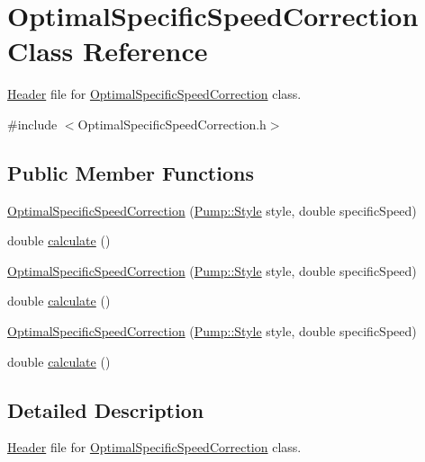 \hypertarget{class_optimal_specific_speed_correction}{}\section{Optimal\+Specific\+Speed\+Correction Class Reference}
\label{class_optimal_specific_speed_correction}


\hyperlink{class_header}{Header} file for \hyperlink{class_optimal_specific_speed_correction}{Optimal\+Specific\+Speed\+Correction} class.  




{\ttfamily \#include $<$Optimal\+Specific\+Speed\+Correction.\+h$>$}

\subsection*{Public Member Functions}
\begin{DoxyCompactItemize}
\item 
\hyperlink{class_optimal_specific_speed_correction_a59cfd32e730fabce525602cbe0b646c4}{Optimal\+Specific\+Speed\+Correction} (\hyperlink{class_pump_aef354601ce4218258cc898b35a1e90ff}{Pump\+::\+Style} style, double specific\+Speed)
\item 
double \hyperlink{class_optimal_specific_speed_correction_a3337ebde4e64c20f19adbda6204fa0be}{calculate} ()
\item 
\hyperlink{class_optimal_specific_speed_correction_a59cfd32e730fabce525602cbe0b646c4}{Optimal\+Specific\+Speed\+Correction} (\hyperlink{class_pump_aef354601ce4218258cc898b35a1e90ff}{Pump\+::\+Style} style, double specific\+Speed)
\item 
double \hyperlink{class_optimal_specific_speed_correction_a3337ebde4e64c20f19adbda6204fa0be}{calculate} ()
\item 
\hyperlink{class_optimal_specific_speed_correction_a59cfd32e730fabce525602cbe0b646c4}{Optimal\+Specific\+Speed\+Correction} (\hyperlink{class_pump_aef354601ce4218258cc898b35a1e90ff}{Pump\+::\+Style} style, double specific\+Speed)
\item 
double \hyperlink{class_optimal_specific_speed_correction_a3337ebde4e64c20f19adbda6204fa0be}{calculate} ()
\end{DoxyCompactItemize}


\subsection{Detailed Description}
\hyperlink{class_header}{Header} file for \hyperlink{class_optimal_specific_speed_correction}{Optimal\+Specific\+Speed\+Correction} class. 

